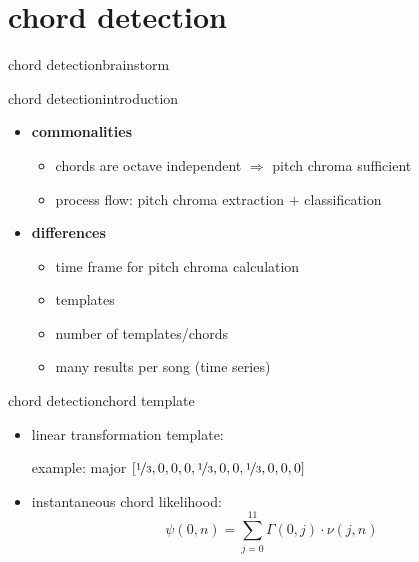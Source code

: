     \section{chord detection}
        \begin{frame}{chord detection}{brainstorm}
        \end{frame}
        \begin{frame}{chord detection}{introduction}

            \begin{itemize}
                \item	\textbf{commonalities}
                    \begin{itemize}
                        \item<2->	chords are octave independent $\Rightarrow$ pitch chroma sufficient
                        \item<2->	process flow: pitch chroma extraction $+$ classification
                    \end{itemize}
                \item<3->	\textbf{differences}
                    \begin{itemize}
                        \item	time frame for pitch chroma calculation
                        \item	templates
                        \item	number of templates/chords
                        \item	many results per song (time series)
                    \end{itemize}
            \end{itemize}
        \end{frame}
        \begin{frame}{chord detection}{chord template}
            \begin{itemize}
                \item	linear transformation template: 
            
                    example: major $[\nicefrac{1}{3},0,0,0,\nicefrac{1}{3},0,0,\nicefrac{1}{3},0,0,0]$
                \item	instantaneous chord likelihood:
                \begin{equation*}
                    {\psi}(0,n) = \sum\limits_{j = 0}^{11}{\Gamma(0,j)\cdot \nu(j,n)}
                \end{equation*}
            \end{itemize}	
        \end{frame}
        
